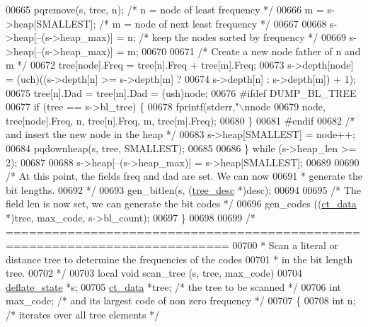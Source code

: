 \begin{DoxyCode}
{{{{{{{{{{{{00665         pqremove(s, tree, n);  \textcolor{comment}{/* n = node of least frequency */}
00666         m = s->heap[SMALLEST]; \textcolor{comment}{/* m = node of next least frequency */}
00667 
00668         s->heap[--(s->heap\_max)] = n; \textcolor{comment}{/* keep the nodes sorted by frequency */}
00669         s->heap[--(s->heap\_max)] = m;
00670 
00671         \textcolor{comment}{/* Create a new node father of n and m */}
00672         tree[node].Freq = tree[n].Freq + tree[m].Freq;
00673         s->depth[node] = (uch)((s->depth[n] >= s->depth[m] ?
00674                                 s->depth[n] : s->depth[m]) + 1);
00675         tree[n].Dad = tree[m].Dad = (ush)node;
00676 \textcolor{preprocessor}{#ifdef DUMP\_BL\_TREE}
00677         \textcolor{keywordflow}{if} (tree == s->bl\_tree) \{
00678             fprintf(stderr,\textcolor{stringliteral}{"\(\backslash\)nnode %
00679                     node, tree[node].Freq, n, tree[n].Freq, m, tree[m].Freq);
00680         \}
00681 \textcolor{preprocessor}{#endif}
00682         \textcolor{comment}{/* and insert the new node in the heap */}
00683         s->heap[SMALLEST] = node++;
00684         pqdownheap(s, tree, SMALLEST);
00685 
00686     \} \textcolor{keywordflow}{while} (s->heap\_len >= 2);
00687 
00688     s->heap[--(s->heap\_max)] = s->heap[SMALLEST];
00689 
00690     \textcolor{comment}{/* At this point, the fields freq and dad are set. We can now}
00691 \textcolor{comment}{     * generate the bit lengths.}
00692 \textcolor{comment}{     */}
00693     gen\_bitlen(s, (\hyperlink{structtree__desc__s}{tree\_desc} *)desc);
00694 
00695     \textcolor{comment}{/* The field len is now set, we can generate the bit codes */}
00696     gen\_codes ((\hyperlink{structct__data__s}{ct\_data} *)tree, max\_code, s->bl\_count);
00697 \}
00698 
00699 \textcolor{comment}{/* ===========================================================================}
00700 \textcolor{comment}{ * Scan a literal or distance tree to determine the frequencies of the codes}
00701 \textcolor{comment}{ * in the bit length tree.}
00702 \textcolor{comment}{ */}
00703 local \textcolor{keywordtype}{void} scan\_tree (s, tree, max\_code)
00704     \hyperlink{structinternal__state}{deflate\_state} *s;
00705     \hyperlink{structct__data__s}{ct\_data} *tree;   \textcolor{comment}{/* the tree to be scanned */}
00706     \textcolor{keywordtype}{int} max\_code;    \textcolor{comment}{/* and its largest code of non zero frequency */}
00707 \{
00708     \textcolor{keywordtype}{int} n;                     \textcolor{comment}{/* iterates over all tree elements */}
}}}}}}}}}}}}}
\end{DoxyCode}
